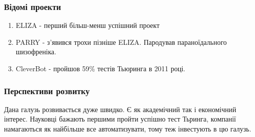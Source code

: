 \documentclass{beamer}
\begin{document}
    \begin{frame}
        \frametitle{Відомі проекти}
        \begin{enumerate}
            \item ELIZA - перший більш-менш успішний проект
            \item PARRY - з'явився трохи пізніше ELIZA. Пародував параноїдального шизофреніка.
            \item CleverBot - пройшов 59\% тестів Тьюринга в 2011 році.
        \end{enumerate}
    \end{frame}

    \begin{frame}
        \frametitle{Перспективи розвитку}
        Дана галузь розвивається дуже швидко. Є як академічний так і економічний інтерес. Науковці бажають першими пройти успішно тест Тьринга, компанії намагаються як найбільше все автоматизувати, тому теж інвестують в цю галузь.
    \end{frame}
\end{document}
